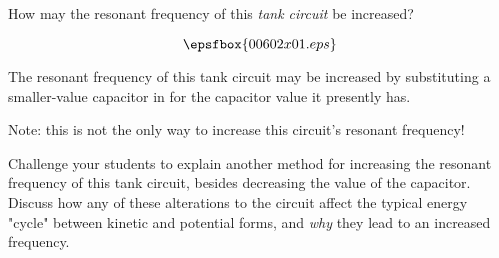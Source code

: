 

How may the resonant frequency of this {\it tank circuit} be increased?

$$\epsfbox{00602x01.eps}$$







The resonant frequency of this tank circuit may be increased by substituting a smaller-value capacitor in for the capacitor value it presently has.

\vskip 10pt

Note: this is not the only way to increase this circuit's resonant frequency!







Challenge your students to explain another method for increasing the resonant frequency of this tank circuit, besides decreasing the value of the capacitor.  Discuss how any of these alterations to the circuit affect the typical energy "cycle" between kinetic and potential forms, and {\it why} they lead to an increased frequency.




